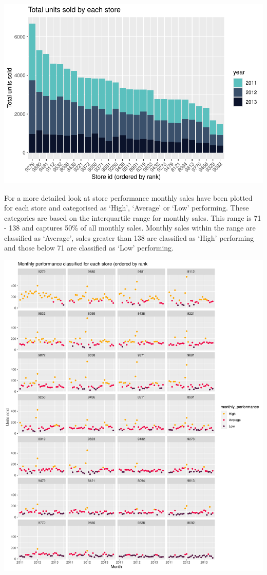 \documentclass[
  11pt,
]{article}
\begin{document}
\includegraphics{Assignment-STAT702_files/figure-latex/1b store totals-1.pdf}

For a more detailed look at store performance monthly sales have been
plotted for each store and categorised as `High', `Average' or `Low'
performing. These categories are based on the interquartile range for
monthly sales. This range is 71 - 138 and captures 50\% of all monthly
sales. Monthly sales within the range are classified as `Average', sales
greater than 138 are classified as `High' performing and those below 71
are classified as `Low' performing.

\includegraphics{Assignment-STAT702_files/figure-latex/store plots-1.pdf}
\end{document}
